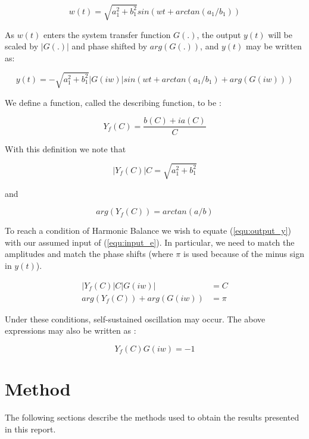 \documentclass[a4paper, titlepage]{article}
\begin{document}
\begin{equation}
	w(t) = \sqrt{a_{1}^2+b_{1}^2}sin(wt+arctan(a_{1}/b_{1}))
\end{equation}

As $w(t)$ enters the system transfer function $G(.)$, the output $y(t)$ will be scaled by $|G(.)|$ and phase shifted by $arg(G(.))$, and $y(t)$ may be written as:

\begin{equation}
	y(t) = -\sqrt{a_{1}^2+b_{1}^2}|G(iw)|sin(wt+arctan(a_{1}/b_{1})+arg(G(iw)))
	\label{equ:output_y}
\end{equation}
 

We define a function, called the describing function, to be \citep[p. 358]{glad00}:

\begin{equation}
	Y_{f}(C) = \frac{b(C)+ia(C)}{C}
	\label{equ:descrbingFunction}
\end{equation}

With this definition we note that

\begin{equation}
	|Y_{f}(C)|C = \sqrt{a_{1}^2+b_{1}^2}
\end{equation}

and

\begin{equation}
	arg(Y_{f}(C)) = arctan(a/b)
\end{equation}

To reach a condition of Harmonic Balance we wish to equate (\ref{equ:output_y}) with our assumed input of (\ref{equ:input_e}).   
In particular, we need to match the amplitudes and match the phase shifts (where $\pi$ is used because of the minus sign in $y(t)$). 

\begin{equation}
\begin{split}
	|Y_{f}(C)|C|G(iw)| &= C \\
	arg(Y_{f}(C))+arg(G(iw)) &= \pi
\end{split}
\end{equation}

Under these conditions, self-sustained oscillation may occur.  The above expressions may also be written as \citep[p. 359]{glad00}:

\begin{equation}
	Y_{f}(C)G(iw) = -1
\label{equ:selfOsc}
\end{equation}
 
 
 
 
\section{Method}
The following sections describe the methods used to obtain the results presented in this report.
\end{document}
